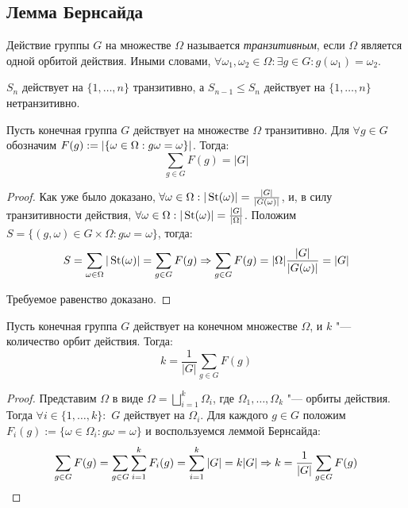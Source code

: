 \subsection{Лемма Бернсайда}

\begin{definition}
	Действие группы $G$ на множестве $\Omega$ называется \textit{транзитивным}, если $\Omega$ является одной орбитой действия. Иными словами, $\forall \omega_1, \omega_2 \in \Omega: \exists g \in G: g(\omega_1) = \omega_2$.
\end{definition}

\begin{example}
	$S_n$ действует на $\{1, \dotsc, n\}$ транзитивно, а $S_{n-1} \le S_n$ действует на $\{1, \dotsc, n\}$ нетранзитивно.
\end{example}

\begin{theorem}
	Пусть конечная группа $G$ действует на множестве $\Omega$ транзитивно. Для $\forall g \in G$ обозначим $F(g) := |\{\omega \hm\in \Omega: g\omega = \omega\}|$. Тогда:
	\[\sum\limits_{g \in G}F(g) = |G|\]
\end{theorem}

\begin{proof}
	Как уже было доказано, $\forall \omega \in \Omega: |\operatorname{St}(\omega)| = \frac{|G|}{|G(\omega)|}$, и, в силу транзитивности действия, $\forall \omega \in \Omega: |\operatorname{St}(\omega)| = \frac{|G|}{|\Omega|}$. Положим $S = \{(g, \omega) \in G \times \Omega: g\omega = \omega\}$, тогда:
	\[S = \sum\limits_{\omega \in \Omega}|\operatorname{St}(\omega)| = \sum\limits_{g \in G}F(g) \Rightarrow \sum\limits_{g \in G}F(g) = |\Omega|\frac{|G|}{|G(\omega)|} = |G|\]
	
	Требуемое равенство доказано.
\end{proof}

\begin{corollary}
	Пусть конечная группа $G$ действует на конечном множестве $\Omega$, и $k$ "--- количество орбит действия. Тогда:
	\[k = \frac1{|G|}\sum\limits_{g \in G}F(g)\]
\end{corollary}

\begin{proof}
	Представим $\Omega$ в виде $\Omega = \bigsqcup_{i = 1}^k\Omega_i$, где $\Omega_1, \dotsc, \Omega_k$ "--- орбиты действия. Тогда $\forall i \in \{1, \dotsc, k\}:$ $G$ действует на $\Omega_i$. Для каждого $g \in G$ положим $F_i(g) := \{\omega \in \Omega_i: g\omega = \omega\}$ и воспользуемся леммой Бернсайда:
	\[\sum\limits_{g \in G}F(g) = \sum\limits_{g \in G}\sum\limits_{i = 1}^kF_i(g) = \sum\limits_{i = 1}^k|G| = k|G| \Rightarrow k = \frac1{|G|}\sum\limits_{g \in G}F(g)\]
\end{proof}

